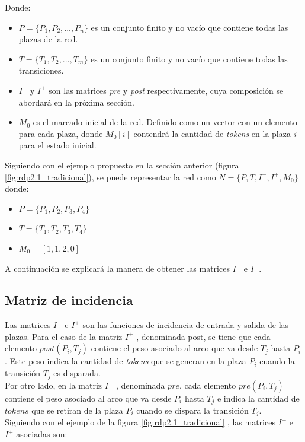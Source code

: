 \noindent Donde:
\begin{itemize}
    \item $ P = \{P_1 , P_2,..., P_n \}$ es un conjunto finito y no vacío que contiene todas las plazas de la red.
    \item $T = \{T_1 , T_2, ... ,T_m \}$ es un conjunto finito y no vacío que contiene todas las transiciones.
    \item $I^{-}$ y $I^+$ son las matrices \textit{pre} y \textit{post} respectivamente, cuya composición se abordará en la próxima sección.
    \item $M_0$ es el marcado inicial de la red. Definido como un vector con un elemento para cada plaza, donde $M_0[i]$ contendrá la cantidad de \textit{tokens} en la plaza \textit{i} para el estado inicial.
\end{itemize}

Siguiendo con el ejemplo propuesto en la sección anterior (figura \ref{fig:rdp2.1_tradicional}), se puede representar la red como $N = \{P, T, I^- , I^+ , M_0 \}$ donde:

\begin{itemize}
    \item $P = \{P_1 , P_2, P_3 , P_4 \}$ 
    \item $T =  \{T_1, T_2, T_3, T_4\}$
    \item $M_0 = [1,1,2,0]$
\end{itemize}

\noindent A continuación se explicará la manera de obtener las matrices $I^-$ e $I^+$.


\subsection{Matriz de incidencia}
Las matrices  $I^-$ e $I^+$ son las funciones de incidencia de entrada y salida de las plazas. Para el caso de la matriz $I^+$ , denominada post, se tiene que cada elemento $post(P_i , T_j)$ contiene el peso asociado al arco que va desde $T_j$ hasta $P_i$ . Este peso indica la cantidad de \textit{tokens} que se generan en la plaza $P_i$ cuando la transición $T_j$ es disparada. \\
Por otro lado, en la matriz $I^-$ , denominada $pre$, cada elemento $pre(P_i , T_j)$ contiene el peso asociado al arco que va desde $P_i$ hasta $T_j$ e indica la cantidad de $tokens$ que se retiran de la plaza $P_i$ cuando se dispara la transición $T_j$.\\

\hfill \break 
Siguiendo con el ejemplo de la figura \ref{fig:rdp2.1_tradicional} , las matrices $I^-$ e $I^+$ asociadas son:

